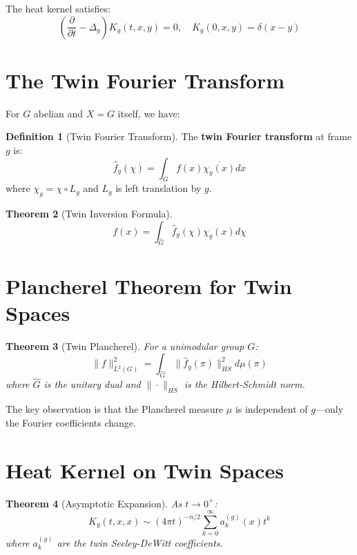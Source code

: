 \documentclass[11pt,a4paper,openright]{book}
\theoremstyle{plain}
\newtheorem{theorem}{Theorem}[chapter]
\theoremstyle{definition}
\newtheorem{definition}[theorem]{Definition}
\begin{document}
The heat kernel satisfies:
\begin{equation}
\left(\frac{\partial}{\partial t} - \Delta_g\right) K_g(t, x, y) = 0, \quad K_g(0, x, y) = \delta(x - y)
\end{equation}

\section{The Twin Fourier Transform}

For $G$ abelian and $X = G$ itself, we have:

\begin{definition}[Twin Fourier Transform]
The \textbf{twin Fourier transform} at frame $g$ is:
\begin{equation}
\hat{f}_g(\chi) = \int_G f(x) \overline{\chi_g(x)} dx
\end{equation}
where $\chi_g = \chi \circ L_g$ and $L_g$ is left translation by $g$.
\end{definition}

\begin{theorem}[Twin Inversion Formula]
\begin{equation}
f(x) = \int_{\hat{G}} \hat{f}_g(\chi) \chi_g(x) d\chi
\end{equation}
\end{theorem}

\section{Plancherel Theorem for Twin Spaces}

\begin{theorem}[Twin Plancherel]
For a unimodular group $G$:
\begin{equation}
\|f\|_{L^2(G)}^2 = \int_{\hat{G}} \|\hat{f}_g(\pi)\|_{HS}^2 d\mu(\pi)
\end{equation}
where $\hat{G}$ is the unitary dual and $\|\cdot\|_{HS}$ is the Hilbert-Schmidt norm.
\end{theorem}

The key observation is that the Plancherel measure $\mu$ is independent of $g$---only the Fourier coefficients change.

\section{Heat Kernel on Twin Spaces}

\begin{theorem}[Asymptotic Expansion]
As $t \to 0^+$:
\begin{equation}
K_g(t, x, x) \sim (4\pi t)^{-n/2} \sum_{k=0}^\infty a_k^{(g)}(x) t^k
\end{equation}
where $a_k^{(g)}$ are the twin Seeley-DeWitt coefficients.
\end{theorem}
\end{document}
